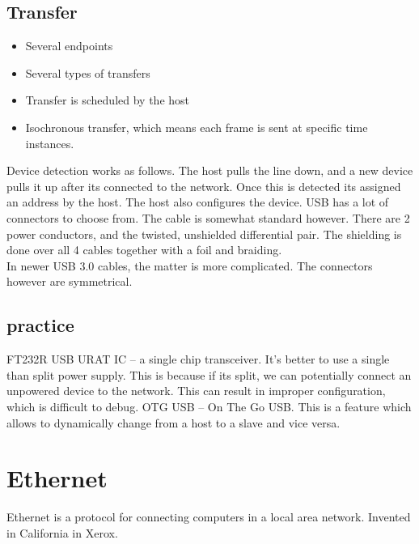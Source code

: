\subsection{Transfer}
\begin{itemize}
        \item Several endpoints
        \item Several types of transfers
        \item Transfer is scheduled by the host
        \item Isochronous transfer, which means each frame is sent at specific time instances.
        
\end{itemize}

Device detection works as follows. The host pulls the line down, and a new device pulls it up after its connected to the network. Once this is detected its
assigned an address by the host. The host also configures the device.
\nt
{
    USB has a lot of connectors to choose from. The cable is somewhat standard however. There are 2 power conductors, and the twisted, unshielded differential pair.
    The shielding is done over all 4 cables together with a foil and braiding.\\
    In newer USB 3.0 cables, the matter is more complicated. The connectors however are symmetrical.
}

\subsection{practice}
FT232R USB URAT IC -- a single chip transceiver.
\nt
{
    It's better to use a single than split power supply. This is because if its split, we can potentially connect an unpowered device to the network. This can 
    result in improper configuration, which is difficult to debug. 
}
OTG USB -- On The Go USB. This is a feature which allows to dynamically change from a host to a slave and vice versa.


\section{Ethernet}
Ethernet is a protocol for connecting computers in a local area network. Invented in California in Xerox.
